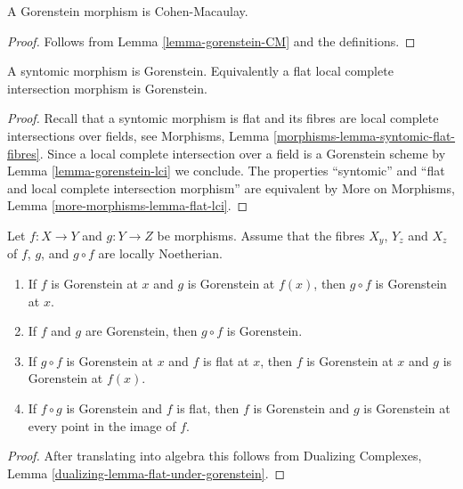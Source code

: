 \begin{lemma}
\label{lemma-gorenstein-CM-morphism}
A Gorenstein morphism is Cohen-Macaulay.
\end{lemma}

\begin{proof}
Follows from Lemma \ref{lemma-gorenstein-CM} and the definitions.
\end{proof}

\begin{lemma}
\label{lemma-lci-gorenstein}
A syntomic morphism is Gorenstein. Equivalently a flat
local complete intersection morphism is Gorenstein.
\end{lemma}

\begin{proof}
Recall that a syntomic morphism is flat and its fibres
are local complete intersections over fields, see
Morphisms, Lemma \ref{morphisms-lemma-syntomic-flat-fibres}.
Since a local complete intersection over a field is a Gorenstein scheme
by Lemma \ref{lemma-gorenstein-lci} we conclude.
The properties ``syntomic'' and ``flat and local
complete intersection morphism'' are equivalent by
More on Morphisms, Lemma \ref{more-morphisms-lemma-flat-lci}.
\end{proof}

\begin{lemma}
\label{lemma-composition-gorenstein}
Let $f : X \to Y$ and $g : Y \to Z$ be morphisms. Assume that the
fibres $X_y$, $Y_z$ and $X_z$ of $f$, $g$, and $g \circ f$ are
locally Noetherian.
\begin{enumerate}
\item If $f$ is Gorenstein at $x$ and $g$ is Gorenstein
at $f(x)$, then $g \circ f$ is Gorenstein at $x$.
\item If $f$ and $g$ are Gorenstein, then $g \circ f$ is Gorenstein.
\item If $g \circ f$ is Gorenstein at $x$ and $f$ is flat at $x$,
then $f$ is Gorenstein at $x$ and $g$ is Gorenstein at $f(x)$.
\item If $f \circ g$ is Gorenstein and $f$ is flat, then
$f$ is Gorenstein and $g$ is Gorenstein at every point in
the image of $f$.
\end{enumerate}
\end{lemma}

\begin{proof}
After translating into algebra this follows from
Dualizing Complexes, Lemma \ref{dualizing-lemma-flat-under-gorenstein}.
\end{proof}

